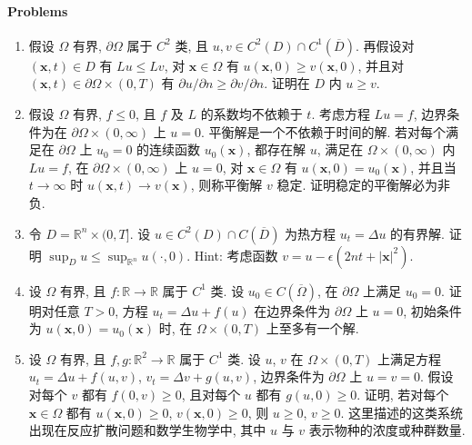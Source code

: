 \paragraph*{Problems}

\begin{enumerate}[label=\thesection.\arabic*.,ref=\thesection.\arabic*,start=22,series=book-problems]

\item\label{ex:parabolic-neumann-comparison} 假设 $\Omega$ 有界, $\partial\Omega$ 属于 $C^2$ 类, 且 $u,v\in C^2(D)\cap C^1(\overline D)$. 再假设对 $(\bm{x},t)\in D$ 有 $Lu\leq Lv$, 对 $\bm{x}\in\Omega$ 有 $u(\bm{x},0)\geq v(\bm{x},0)$, 并且对 $(\bm{x},t)\in\partial\Omega\times(0,T)$ 有 $\partial u/\partial n\geq\partial v/\partial n$. 证明在 $D$ 内 $u\geq v$.

\item\label{ex:parabolic-stable-equilibrium-nonnegative} 假设 $\Omega$ 有界, $f\leq0$, 且 $f$ 及 $L$ 的系数均不依赖于 $t$. 考虑方程 $Lu=f$, 边界条件为在 $\partial\Omega\times(0,\infty)$ 上 $u=0$. 平衡解是一个不依赖于时间的解. 若对每个满足在 $\partial\Omega$ 上 $u_0=0$ 的连续函数 $u_0(\bm{x})$, 都存在解 $u$, 满足在 $\Omega\times(0,\infty)$ 内 $Lu=f$, 在 $\partial\Omega\times(0,\infty)$ 上 $u=0$, 对 $\bm{x}\in\Omega$ 有 $u(\bm{x},0)=u_0(\bm{x})$, 并且当 $t\to\infty$ 时 $u(\bm{x},t)\to v(\bm{x})$, 则称平衡解 $v$ 稳定. 证明稳定的平衡解必为非负.

\item\label{ex:whole-space-bounded-heat-maximum} 令 $D=\mathbb{R}^n\times(0,T]$. 设 $u\in C^2(D)\cap C(\overline D)$ 为热方程 $u_t=\Delta u$ 的有界解. 证明 $\sup_Du\leq\sup_{\mathbb{R}^n}u(\cdot,0)$. Hint: 考虑函数 $v=u-\epsilon(2nt+|\bm{x}|^2)$.

\item\label{ex:semilinear-parabolic-uniqueness} 设 $\Omega$ 有界, 且 $f:\mathbb{R}\to\mathbb{R}$ 属于 $C^1$ 类. 设 $u_0\in C(\overline\Omega)$, 在 $\partial\Omega$ 上满足 $u_0=0$. 证明对任意 $T>0$, 方程 $u_t=\Delta u+f(u)$ 在边界条件为 $\partial\Omega$ 上 $u=0$, 初始条件为 $u(\bm{x},0)=u_0(\bm{x})$ 时, 在 $\Omega\times(0,T)$ 上至多有一个解.

\item\label{ex:reaction-diffusion-positivity} 设 $\Omega$ 有界, 且 $f,g:\mathbb{R}^2\to\mathbb{R}$ 属于 $C^1$ 类. 设 $u$, $v$ 在 $\Omega\times(0,T)$ 上满足方程 $u_t=\Delta u+f(u,v)$, $v_t=\Delta v+g(u,v)$, 边界条件为 $\partial\Omega$ 上 $u=v=0$. 假设对每个 $v$ 都有 $f(0,v)\geq0$, 且对每个 $u$ 都有 $g(u,0)\geq0$. 证明, 若对每个 $\bm{x}\in\Omega$ 都有 $u(\bm{x},0)\geq0$, $v(\bm{x},0)\geq0$, 则 $u\geq0$, $v\geq0$. 这里描述的这类系统出现在反应扩散问题和数学生物学中, 其中 $u$ 与 $v$ 表示物种的浓度或种群数量.

\end{enumerate}
